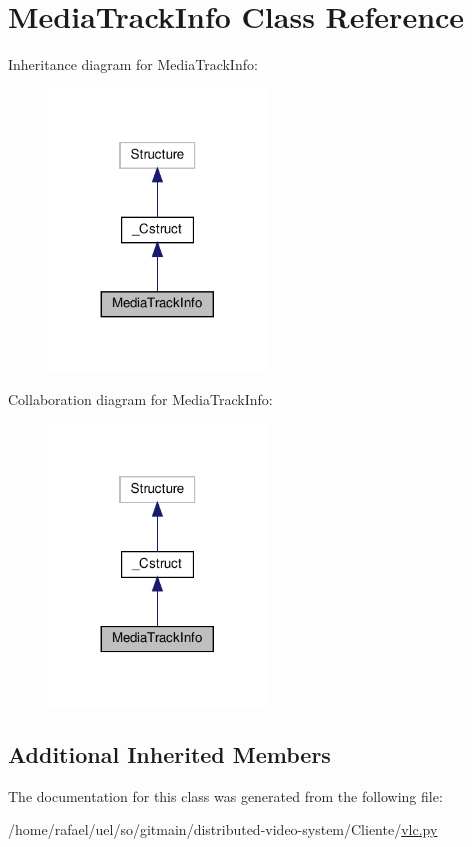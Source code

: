 \hypertarget{classvlc_1_1_media_track_info}{}\section{Media\+Track\+Info Class Reference}
\label{classvlc_1_1_media_track_info}


Inheritance diagram for Media\+Track\+Info\+:
\nopagebreak
\begin{figure}[H]
\begin{center}
\leavevmode
\includegraphics[width=164pt]{classvlc_1_1_media_track_info__inherit__graph}
\end{center}
\end{figure}


Collaboration diagram for Media\+Track\+Info\+:
\nopagebreak
\begin{figure}[H]
\begin{center}
\leavevmode
\includegraphics[width=164pt]{classvlc_1_1_media_track_info__coll__graph}
\end{center}
\end{figure}
\subsection*{Additional Inherited Members}


The documentation for this class was generated from the following file\+:\begin{DoxyCompactItemize}
\item 
/home/rafael/uel/so/gitmain/distributed-\/video-\/system/\+Cliente/\hyperlink{vlc_8py}{vlc.\+py}\end{DoxyCompactItemize}
